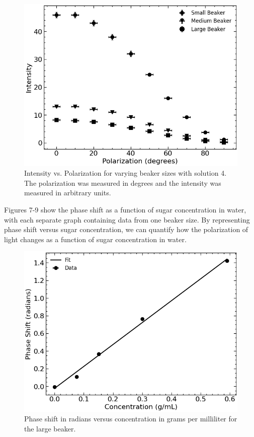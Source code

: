 \begin{figure}[H]
    \begin{center}
        \includegraphics[width=\columnwidth]{../figures/solution4.png}
    \end{center}
    \caption{Intensity vs. Polarization for varying beaker sizes with solution 4. The polarization was measured in degrees and the intensity was measured in arbitrary units.}
    \label{fig:solution4}
\end{figure}

Figures 7-9 show the phase shift as a function of sugar concentration in water, with each separate graph containing data from one beaker size. By representing phase shift versus sugar concentration, we can quantify how the polarization of light changes as a function of sugar concentration in water.

\begin{figure}[H]
    \begin{center}
        \includegraphics[width=\columnwidth]{../figures/large_beaker_phase_shifts.png}
    \end{center}
    \caption{Phase shift in radians versus concentration in grams per milliliter for the large beaker.}
    \label{fig:large_beaker_phase_shifts}
\end{figure}

